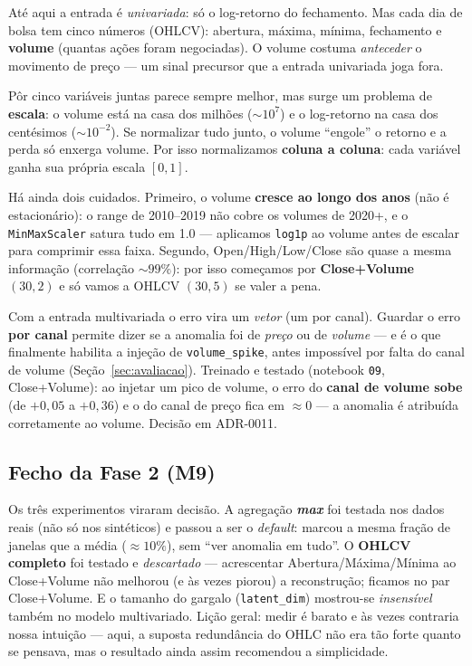 Até aqui a entrada é \emph{univariada}: só o log-retorno do fechamento. Mas cada dia de bolsa tem
cinco números (OHLCV): abertura, máxima, mínima, fechamento e \textbf{volume} (quantas ações
foram negociadas). O volume costuma \emph{anteceder} o movimento de preço --- um sinal precursor
que a entrada univariada joga fora.

\begin{intuicao}
Pôr cinco variáveis juntas parece sempre melhor, mas surge um problema de \textbf{escala}: o
volume está na casa dos milhões ($\sim 10^7$) e o log-retorno na casa dos centésimos
($\sim 10^{-2}$). Se normalizar tudo junto, o volume ``engole'' o retorno e a perda só enxerga
volume. Por isso normalizamos \textbf{coluna a coluna}: cada variável ganha sua própria escala
$[0,1]$.
\end{intuicao}

Há ainda dois cuidados. Primeiro, o volume \textbf{cresce ao longo dos anos} (não é
estacionário): o range de 2010--2019 não cobre os volumes de 2020+, e o \texttt{MinMaxScaler}
satura tudo em 1.0 --- aplicamos \texttt{log1p} ao volume antes de escalar para comprimir essa
faixa. Segundo, Open/High/Low/Close são quase a mesma informação (correlação $\sim 99\%$): por
isso começamos por \textbf{Close+Volume} $(30,2)$ e só vamos a OHLCV $(30,5)$ se valer a pena.

\begin{naprat}
Com a entrada multivariada o erro vira um \emph{vetor} (um por canal). Guardar o erro
\textbf{por canal} permite dizer se a anomalia foi de \emph{preço} ou de \emph{volume} --- e é o
que finalmente habilita a injeção de \texttt{volume\_spike}, antes impossível por falta do canal
de volume (Seção~\ref{sec:avaliacao}). Treinado e testado (notebook \texttt{09}, Close+Volume):
ao injetar um pico de volume, o erro do \textbf{canal de volume sobe} (de $+0{,}05$ a $+0{,}36$)
e o do canal de preço fica em $\approx 0$ --- a anomalia é atribuída corretamente ao volume.
Decisão em ADR-0011.
\end{naprat}

\subsection{Fecho da Fase 2 (M9)}
\label{sec:fase2-m9}
Os três experimentos viraram decisão. A agregação \textbf{\emph{max}} foi testada nos dados reais
(não só nos sintéticos) e passou a ser o \emph{default}: marcou a mesma fração de janelas que a
média ($\approx 10\%$), sem ``ver anomalia em tudo''. O \textbf{OHLCV completo} foi testado e
\emph{descartado} --- acrescentar Abertura/Máxima/Mínima ao Close+Volume não melhorou (e às vezes
piorou) a reconstrução; ficamos no par Close+Volume. E o tamanho do gargalo (\texttt{latent\_dim})
mostrou-se \emph{insensível} também no modelo multivariado. Lição geral: medir é barato e às vezes
contraria nossa intuição --- aqui, a suposta redundância do OHLC não era tão forte quanto se
pensava, mas o resultado ainda assim recomendou a simplicidade.
